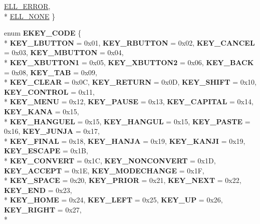 \begin{DoxyCompactItemize}
\hyperlink{namespaceirr_aa2d1cac68606a25ed24cfffccfa30a92a1c16e615e15fc3f75bacb50faaeb73ff}{E\+L\+L\+\_\+\+E\+R\+R\+OR}, 
\\*
\hyperlink{namespaceirr_aa2d1cac68606a25ed24cfffccfa30a92a558fe286a76cbba090c8301f7b1f7dcb}{E\+L\+L\+\_\+\+N\+O\+NE}
 \}
\item 
enum {\bfseries E\+K\+E\+Y\+\_\+\+C\+O\+DE} \{ \\*
{\bfseries K\+E\+Y\+\_\+\+L\+B\+U\+T\+T\+ON} = 0x01, 
{\bfseries K\+E\+Y\+\_\+\+R\+B\+U\+T\+T\+ON} = 0x02, 
{\bfseries K\+E\+Y\+\_\+\+C\+A\+N\+C\+EL} = 0x03, 
{\bfseries K\+E\+Y\+\_\+\+M\+B\+U\+T\+T\+ON} = 0x04, 
\\*
{\bfseries K\+E\+Y\+\_\+\+X\+B\+U\+T\+T\+O\+N1} = 0x05, 
{\bfseries K\+E\+Y\+\_\+\+X\+B\+U\+T\+T\+O\+N2} = 0x06, 
{\bfseries K\+E\+Y\+\_\+\+B\+A\+CK} = 0x08, 
{\bfseries K\+E\+Y\+\_\+\+T\+AB} = 0x09, 
\\*
{\bfseries K\+E\+Y\+\_\+\+C\+L\+E\+AR} = 0x0C, 
{\bfseries K\+E\+Y\+\_\+\+R\+E\+T\+U\+RN} = 0x0D, 
{\bfseries K\+E\+Y\+\_\+\+S\+H\+I\+FT} = 0x10, 
{\bfseries K\+E\+Y\+\_\+\+C\+O\+N\+T\+R\+OL} = 0x11, 
\\*
{\bfseries K\+E\+Y\+\_\+\+M\+E\+NU} = 0x12, 
{\bfseries K\+E\+Y\+\_\+\+P\+A\+U\+SE} = 0x13, 
{\bfseries K\+E\+Y\+\_\+\+C\+A\+P\+I\+T\+AL} = 0x14, 
{\bfseries K\+E\+Y\+\_\+\+K\+A\+NA} = 0x15, 
\\*
{\bfseries K\+E\+Y\+\_\+\+H\+A\+N\+G\+U\+EL} = 0x15, 
{\bfseries K\+E\+Y\+\_\+\+H\+A\+N\+G\+UL} = 0x15, 
{\bfseries K\+E\+Y\+\_\+\+P\+A\+S\+TE} = 0x16, 
{\bfseries K\+E\+Y\+\_\+\+J\+U\+N\+JA} = 0x17, 
\\*
{\bfseries K\+E\+Y\+\_\+\+F\+I\+N\+AL} = 0x18, 
{\bfseries K\+E\+Y\+\_\+\+H\+A\+N\+JA} = 0x19, 
{\bfseries K\+E\+Y\+\_\+\+K\+A\+N\+JI} = 0x19, 
{\bfseries K\+E\+Y\+\_\+\+E\+S\+C\+A\+PE} = 0x1B, 
\\*
{\bfseries K\+E\+Y\+\_\+\+C\+O\+N\+V\+E\+RT} = 0x1C, 
{\bfseries K\+E\+Y\+\_\+\+N\+O\+N\+C\+O\+N\+V\+E\+RT} = 0x1D, 
{\bfseries K\+E\+Y\+\_\+\+A\+C\+C\+E\+PT} = 0x1E, 
{\bfseries K\+E\+Y\+\_\+\+M\+O\+D\+E\+C\+H\+A\+N\+GE} = 0x1F, 
\\*
{\bfseries K\+E\+Y\+\_\+\+S\+P\+A\+CE} = 0x20, 
{\bfseries K\+E\+Y\+\_\+\+P\+R\+I\+OR} = 0x21, 
{\bfseries K\+E\+Y\+\_\+\+N\+E\+XT} = 0x22, 
{\bfseries K\+E\+Y\+\_\+\+E\+ND} = 0x23, 
\\*
{\bfseries K\+E\+Y\+\_\+\+H\+O\+ME} = 0x24, 
{\bfseries K\+E\+Y\+\_\+\+L\+E\+FT} = 0x25, 
{\bfseries K\+E\+Y\+\_\+\+UP} = 0x26, 
{\bfseries K\+E\+Y\+\_\+\+R\+I\+G\+HT} = 0x27, 
\\*

\end{DoxyCompactItemize}
